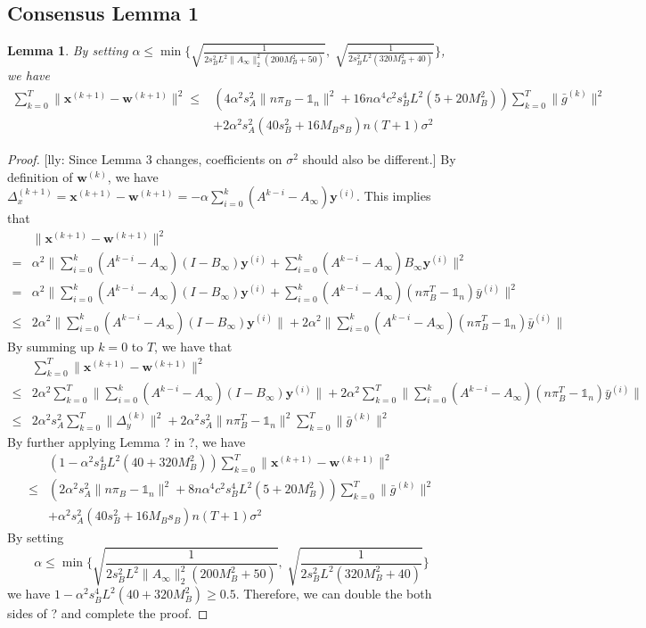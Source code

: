 \documentclass{article}
\newtheorem{lemma}[thm]{Lemma}
\newcommand{\vw}{{\mathbf{w}}}
\newcommand{\vx}{{\mathbf{x}}}
\newcommand{\vy}{{\mathbf{y}}}
\newcommand{\norm}[1]{\| #1 \|}
\newcommand{\lly}[1]{{\color{red}[lly: #1]}}
\newcommand{\one}{\mathds{1}_n}
\begin{document}
\subsection{Consensus Lemma 1}
\begin{lemma}
  By setting $\alpha \leq \min\{\sqrt{\frac{1}{2s_B^2L^2\norm{A_{\infty}}_2^2(200M_B^2+50)}},\; \sqrt{\frac{1}{2s_B^2L^2(320M_B^2+40)}}\} $, we have
  \begin{align*}
    \sum_{k=0}^T\norm{\vx^{(k+1)}-\vw^{(k+1)}}^2 
    \leq &\left(4\alpha^2s_A^2\norm{n\pi_B-\one}^2+16n\alpha^4c^2s_B^4L^2(5+20M_B^2)\right) \sum_{k=0}^T\norm{\bar{g}^{(k)}}^2\\ &+2\alpha^2s_A^2(40s_B^2+16M_Bs_B)n (T+1)\sigma^2
  \end{align*}
\end{lemma}
\begin{proof}
\lly{Since Lemma 3 changes, coefficients on $\sigma^2$ should also be different.}
By definition of $\vw^{(k)}$, we have $\Delta_{x}^{(k+1)}=\vx^{(k+1)}-\vw^{(k+1)}=-\alpha\sum_{i=0}^k(A^{k-i}-A_{\infty})\vy^{(i)}$. This implies that
\begin{align*}
&\norm{\vx^{(k+1)}-\vw^{(k+1)}}^2\\ 
=&\alpha^2 \norm{\sum_{i=0}^k(A^{k-i}-A_{\infty})(I-B_{\infty})\vy^{(i)}+\sum_{i=0}^k(A^{k-i}-A_{\infty})B_{\infty}\vy^{(i)}}^2\\ 
=&\alpha^2 \norm{\sum_{i=0}^k(A^{k-i}-A_{\infty})(I-B_{\infty})\vy^{(i)}+\sum_{i=0}^k(A^{k-i}-A_{\infty})(n\pi_{B}^T-\one)\bar{y}^{(i)}}^2\\ 
\leq&2\alpha^2\norm{\sum_{i=0}^k(A^{k-i}-A_{\infty})(I-B_{\infty})\vy^{(i)}}+2\alpha^2\norm{\sum_{i=0}^k(A^{k-i}-A_{\infty})(n\pi_{B}^T-\one)\bar{y}^{(i)}}
\end{align*}
By summing up $k=0$ to $T$, we have that
\begin{align*}
&\sum_{k=0}^T\norm{\vx^{(k+1)}-\vw^{(k+1)}}^2\\ 
\leq& 2\alpha^2\sum_{k=0}^T\norm{\sum_{i=0}^k(A^{k-i}-A_{\infty})(I-B_{\infty})\vy^{(i)}}+2\alpha^2\sum_{k=0}^T\norm{\sum_{i=0}^k(A^{k-i}-A_{\infty})(n\pi_{B}^T-\one)\bar{y}^{(i)}}\\ 
\leq& 2\alpha^2s_{A}^2\sum_{k=0}^T \norm{\Delta_{y}^{(k)}}^2+2\alpha^2s_{A}^2\norm{n\pi_{B}^T-\one}^2\sum_{k=0}^T\norm{\bar{g}^{(k)}}^2
\end{align*}
By further applying Lemma ? in ?, we have
\begin{align*}
  &\left(1-\alpha^2s_B^4L^2(40+320M_B^2)\right)\sum_{k=0}^T\norm{\vx^{(k+1)}-\vw^{(k+1)}}^2\\ 
  \leq &\left(2\alpha^2s_A^2\norm{n\pi_B-\one}^2+8n\alpha^4c^2s_B^4L^2(5+20M_B^2)\right) \sum_{k=0}^T\norm{\bar{g}^{(k)}}^2\\ &+\alpha^2s_A^2(40s_B^2+16M_Bs_B)n (T+1)\sigma^2
\end{align*}
By setting 
$$\alpha \leq \min\{\sqrt{\frac{1}{2s_B^2L^2\norm{A_{\infty}}_2^2(200M_B^2+50)}},\; \sqrt{\frac{1}{2s_B^2L^2(320M_B^2+40)}}\} $$
we have $1-\alpha^2s_B^4L^2(40+320M_B^2)\geq 0.5$. Therefore, we can double the both sides of ? and complete the proof.
\end{proof}
\end{document}
